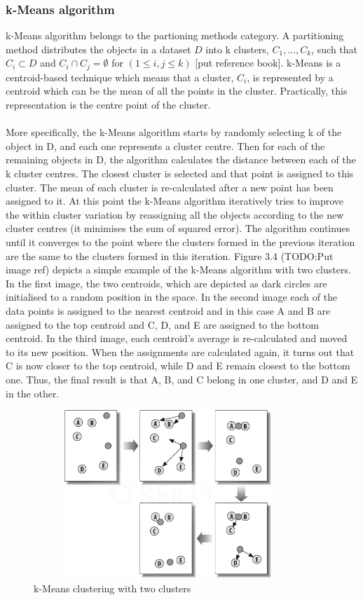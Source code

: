 \subsubsection{k-Means algorithm}
k-Means algorithm belongs to the partioning methods category. A partitioning method distributes the objects in a dataset $D$ into k clusters, $C_1, ..., C_k$, such that $C_i \subset D$ and $C_i \cap C_j = \emptyset$ for $(1 \leq i, j \leq k)$ [put reference book]. k-Means is a centroid-based technique which means that a cluster, $C_i$, is represented by a centroid which can be the mean of all the points in the cluster. Practically, this representation is the centre point of the cluster. \\\\
More specifically, the k-Means algorithm starts by randomly selecting k of the object in D, and each one represents a cluster centre. Then for each of the remaining objects in D, the algorithm calculates the distance between each of the k cluster centres. The closest cluster is selected and that point is assigned to this cluster. The mean of each cluster is re-calculated after a new point has been assigned to it. At this point the k-Means algorithm iteratively tries to improve the within cluster variation by reassigning all the objects according to the new cluster centres  (it minimises the sum of squared error). The algorithm continues until it converges to the point where the clusters formed in the previous iteration are the same to the clusters formed in this iteration. Figure 3.4 (TODO:Put image ref) depicts a simple example of the k-Means algorithm with two clusters. In the first image, the two centroids, which are depicted as dark circles are initialised to a random position in the space. In the second image each of the data points is assigned to the nearest centroid and in this case A and B are assigned to the top centroid and C, D, and E are assigned to the bottom centroid. In the third image, each centroid's average is re-calculated and moved to its new position. When the assignments are calculated again, it turns out that C is now closer to the top centroid, while D and E remain closest to the bottom one. Thus, the final result is that A, B, and C belong in one cluster, and D and E in the other.
\begin{figure}[!htbp]
  \begin{center}
    \includegraphics[height=2.5in, width=4in]{kmeans-example}
    \caption{k-Means clustering with two clusters}
    \label{kMeansExample}
  \end{center}
\end{figure} 
